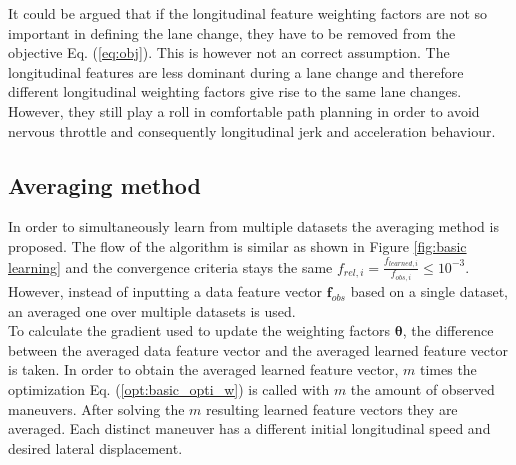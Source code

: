 It could be argued that if the longitudinal feature weighting factors are not so important in defining the lane change, they have to be removed from the objective Eq. (\ref{eq:obj}). This is however not an correct assumption. The longitudinal features are less dominant during a lane change and therefore different longitudinal weighting factors give rise to the same lane changes. However, they still play a roll in comfortable path planning in order to avoid nervous throttle and consequently longitudinal jerk and acceleration behaviour. 


\subsection{Averaging method}\label{s:averaging_method}
In order to simultaneously learn from multiple datasets the averaging method is proposed. \cite{Kuderer2015a} The flow of the algorithm is similar as shown in Figure \ref{fig:basic learning} and the convergence criteria stays the same $f_{rel,i} = \frac{f_{learned,i}}{f_{obs,i}} \leq 10^{-3}$. However, instead of inputting a data feature vector $\bm{f}_{obs}$ based on a single dataset, an averaged one over multiple datasets is used.\\
To calculate the gradient used to update the weighting factors $\bm{\theta}$, the difference between the averaged data feature vector and the averaged learned feature vector is taken. In order to obtain the averaged learned feature vector, $m$ times the optimization Eq. (\ref{opt:basic_opti_w}) is called with $m$ the amount of observed maneuvers. After solving the $m$ resulting learned feature vectors they are averaged. Each distinct maneuver has a different initial longitudinal speed and desired lateral displacement.\\
 

